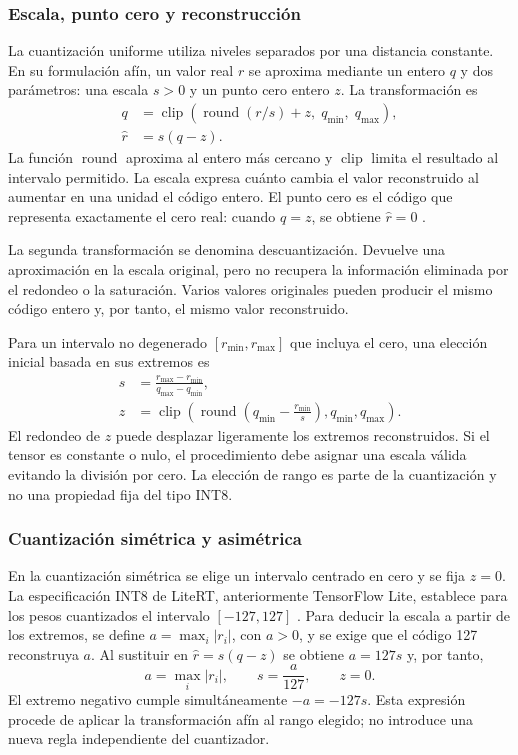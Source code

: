 \subsubsection{Escala, punto cero y reconstrucción}
La cuantización uniforme utiliza niveles separados por una distancia constante. En su formulación afín, un valor real $r$ se aproxima mediante un entero $q$ y dos parámetros: una escala $s>0$ y un punto cero entero $z$. La transformación es
\begin{align}
q&=\operatorname{clip}\!\left(\operatorname{round}(r/s)+z,\;q_{\min},\;q_{\max}\right),\label{eq:cuant}\\
\widehat r&=s(q-z).\label{eq:decuant}
\end{align}
La función $\operatorname{round}$ aproxima al entero más cercano y $\operatorname{clip}$ limita el resultado al intervalo permitido. La escala expresa cuánto cambia el valor reconstruido al aumentar en una unidad el código entero. El punto cero es el código que representa exactamente el cero real: cuando $q=z$, se obtiene $\widehat r=0$ \cite{jacob2018}.

La segunda transformación se denomina descuantización. Devuelve una aproximación en la escala original, pero no recupera la información eliminada por el redondeo o la saturación. Varios valores originales pueden producir el mismo código entero y, por tanto, el mismo valor reconstruido.

Para un intervalo no degenerado $[r_{\min},r_{\max}]$ que incluya el cero, una elección inicial basada en sus extremos es
\begin{align}
s&=\frac{r_{\max}-r_{\min}}{q_{\max}-q_{\min}},\\
z&=\operatorname{clip}\!\left(\operatorname{round}\!\left(q_{\min}-\frac{r_{\min}}{s}\right),q_{\min},q_{\max}\right).
\end{align}
El redondeo de $z$ puede desplazar ligeramente los extremos reconstruidos. Si el tensor es constante o nulo, el procedimiento debe asignar una escala válida evitando la división por cero. La elección de rango es parte de la cuantización y no una propiedad fija del tipo INT8.

\subsubsection{Cuantización simétrica y asimétrica}
En la cuantización simétrica se elige un intervalo centrado en cero y se fija $z=0$. La especificación INT8 de LiteRT, anteriormente TensorFlow Lite, establece para los pesos cuantizados el intervalo $[-127,127]$ \cite{litertspec}. Para deducir la escala a partir de los extremos, se define $a=\max_i|r_i|$, con $a>0$, y se exige que el código 127 reconstruya $a$. Al sustituir en $\widehat r=s(q-z)$ se obtiene $a=127s$ y, por tanto,
\begin{equation}
a=\max_i|r_i|,\qquad s=\frac{a}{127},\qquad z=0.
\label{eq:cap3_simetrica}
\end{equation}
El extremo negativo cumple simultáneamente $-a=-127s$. Esta expresión procede de aplicar la transformación afín al rango elegido; no introduce una nueva regla independiente del cuantizador.

